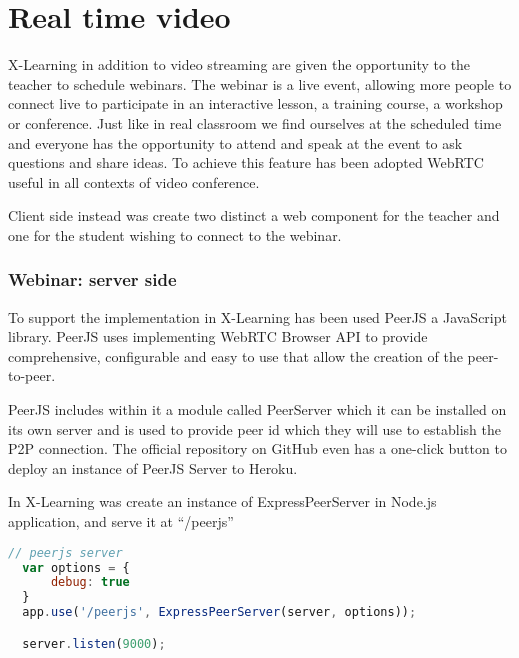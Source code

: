 \newpage
\section{Real time video}
\label{sec:RealTimeVideo}

X-Learning in addition to video streaming are given the opportunity to the teacher to schedule webinars.
The webinar is a live event, allowing more people to connect live to participate in an interactive lesson, a training course, a workshop or conference. Just like in real classroom we find ourselves at the scheduled time and everyone has the opportunity to attend and speak at the event to ask questions and share ideas.
To achieve this feature has been adopted WebRTC useful in all contexts of video conference.


Client side instead was create two distinct a web component for the teacher and one for the student wishing to connect to the webinar.

\subsubsection{Webinar: server side}
To support the implementation in X-Learning has been used PeerJS a JavaScript library.
PeerJS uses implementing WebRTC Browser API to provide comprehensive, configurable and easy to use that allow the creation of the peer-to-peer. 



PeerJS includes within it a module called PeerServer which it can be installed on its own server and is used to provide peer id which they will use to establish the P2P connection. The official repository on GitHub even has a one-click button to deploy an instance of PeerJS Server to Heroku.

In X-Learning was create an instance of ExpressPeerServer in Node.js application, and serve it at “/peerjs”

\begin{lstlisting}[language=javascript]
// peerjs server
  var options = {
      debug: true
  }
  app.use('/peerjs', ExpressPeerServer(server, options));

  server.listen(9000);
\end{lstlisting}

